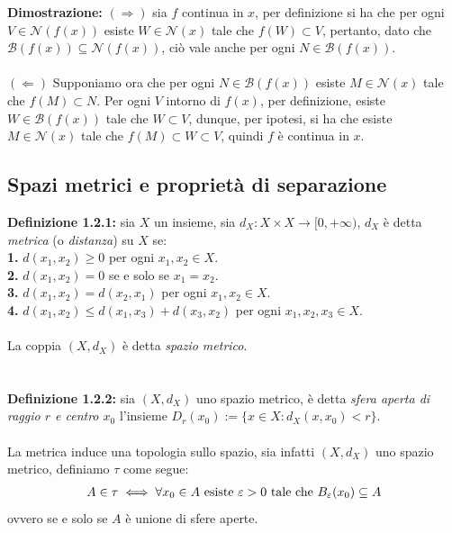 \documentclass{article}
\begin{document}
\textbf{Dimostrazione:} $(\Rightarrow)$ sia $f$ continua in $x$, per definizione si ha che per ogni $V \in \mathcal{N}(f(x))$ esiste $W \in \mathcal{N}(x)$ tale che $f(W) \subset V$, pertanto, dato che $\mathcal{B}(f(x)) \subseteq \mathcal{N}(f(x))$, ciò vale anche per ogni $N \in \mathcal{B}(f(x))$. \\ \\
$(\Leftarrow)$ Supponiamo ora che per ogni $N \in \mathcal{B}(f(x))$ esiste $M \in \mathcal{N}(x)$ tale che $f(M) \subset N$. Per ogni $V$ intorno di $f(x)$, per definizione, esiste $W \in \mathcal{B}(f(x))$ tale che $W \subset V$, dunque, per ipotesi, si ha che esiste $M \in \mathcal{N}(x)$ tale che $f(M) \subset W \subset V$, quindi $f$ è continua in $x$.

\newpage
\subsection{Spazi metrici e proprietà di separazione}
\textbf{Definizione 1.2.1:} sia $X$ un insieme, sia $d_X : X \times X \longrightarrow [0, + \infty)$, $d_X$ è detta \textit{metrica} (o \textit{distanza}) su $X$ se: \\
\textbf{1.} $d(x_1, x_2) \geq 0$ per ogni $x_1, x_2 \in X$. \\
\textbf{2.} $d(x_1, x_2) = 0$ se e solo se $x_1 = x_2$. \\
\textbf{3.} $d(x_1, x_2) = d(x_2, x_1)$ per ogni $x_1, x_2 \in X$. \\
\textbf{4.} $d(x_1, x_2) \leq d(x_1, x_3) + d(x_3, x_2)$ per ogni $x_1, x_2, x_3 \in X$. \\ \\
La coppia $(X, d_X)$ è detta \textit{spazio metrico}. \\ \\ \\
\textbf{Definizione 1.2.2:} sia $(X, d_X)$ uno spazio metrico, è detta \textit{sfera aperta di raggio $r$ e centro $x_0$} l'insieme $D_r(x_0) := \{ x \in X : d_X(x, x_0) < r \}$. \\ \\
La metrica induce una topologia sullo spazio, sia infatti $(X, d_X)$ uno spazio metrico, definiamo $\tau$ come segue:
\begin{gather}
    A \in \tau \iff \forall x_0 \in A \text{ esiste } \varepsilon > 0 \text{ tale che } B_\varepsilon(x_0) \subseteq A \notag
\end{gather}
ovvero se e solo se $A$ è unione di sfere aperte. \\ \\
\end{document}
